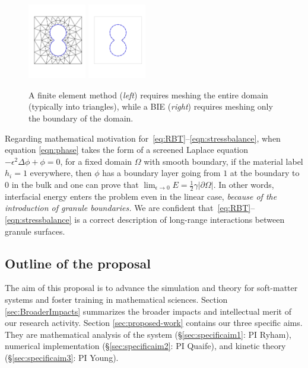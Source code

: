 \begin{figure}
  \centering
  \includegraphics[width=1in]{figures/Background/Peanut/PeanutFEM.pdf}
  \includegraphics[width=1in]{figures/Background/Peanut/PeanutIE.pdf}
  \caption{\label{fig:fem_vs_bie} \footnotesize A finite element method
  ({\em left}) requires meshing the entire domain (typically into
  triangles), while a BIE ({\em right}) requires meshing only the
  boundary of the domain.}
\end{figure}
Regarding mathematical motivation for~\eqref{eq:RBT}--\eqref{eqn:stressbalance},
when equation \eqref{eqn:phase} takes the form of a screened Laplace equation
$-\epsilon^2 \Delta \phi + \phi =0$, for a fixed domain $\Omega$ with
smooth boundary, if the material label $h_i = 1$
everywhere, then $\phi$ has a boundary layer going from $1$ at the
boundary to $0$ in the bulk and one can prove that 
$\lim_{\epsilon \to 0} E = \frac{1}{2}\gamma |\partial \Omega|$.
In other words, 
interfacial energy enters the problem even in the linear case,
\emph{because of the introduction of granule boundaries.}
We are confident
that~\eqref{eq:RBT}--\eqref{eqn:stressbalance} is a correct description
of long-range interactions between granule surfaces.


\subsection{Outline of the proposal}
The aim of this proposal is to advance the simulation
and theory for soft-matter systems
and foster training in mathematical sciences.
Section \ref{sec:BroaderImpacts} summarizes the broader
impacts and intellectual merit of our research activity.
Section \ref{sec:proposed-work} contains our
three specific aims.  They are
mathematical analysis of the system
(\S \ref{sec:specificaim1}: PI Ryham),
numerical implementation
(\S \ref{sec:specificaim2}: PI Quaife),
and  kinetic theory
(\S \ref{sec:specificaim3}: PI Young).



